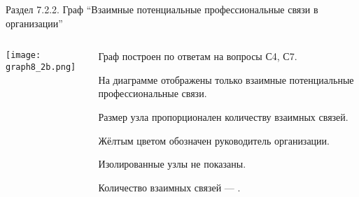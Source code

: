 \begin{frame}{Раздел 7.2.2. Граф ``Взаимные потенциальные профессиональные связи в организации''}

\begin{columns} 
\begin{column}{0.75\textwidth}
\centering
          \texttt{[image: graph8\_2b.png]}
\end{column}
\begin{column}{0.25\textwidth} 

\tiny
Граф  построен по ответам на вопросы С4, С7.
\smallskip

На диаграмме отображены только взаимные потенциальные профессиональные связи.
\smallskip

Размер узла пропорционален количеству взаимных связей.
\smallskip

Жёлтым цветом обозначен руководитель организации.
\smallskip

Изолированные узлы не показаны.
\bigskip

Количество взаимных связей --- \valHBBlinks.


\end{column}
\end{columns}
\end{frame}



